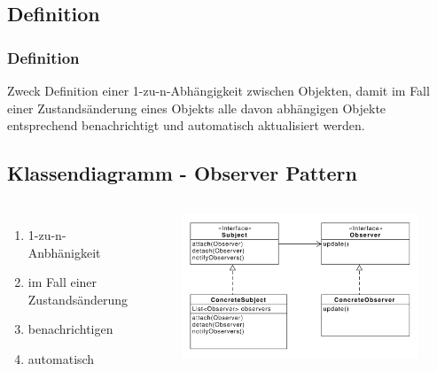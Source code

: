 \subsection{Definition}
\begin{frame}
  \frametitle{Definition}

  \begin{block}{Zweck}
  	Definition einer 1-zu-n-Abhängigkeit zwischen Objekten, damit im Fall einer Zustandsänderung eines Objekts alle davon abhängigen Objekte entsprechend benachrichtigt und automatisch aktualisiert werden.
  \end{block}
  
\end{frame}

\subsection{Klassendiagramm - Observer Pattern}
\begin{frame}
\begin{columns} 
    		\begin{enumerate}
    			\item 1-zu-n-Anbhänigkeit
    			\item im Fall einer Zustandsänderung
    			\item benachrichtigen
    			\item automatisch
    		\end{enumerate}
    			\begin{figure}
					\includegraphics[scale=.4]{paper/observer/observer}
				\end{figure}
  	\end{columns} 
\end{frame}

